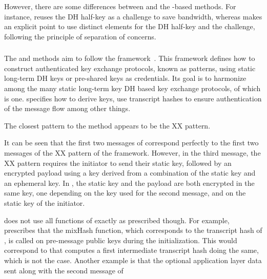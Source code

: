 %
%
However, there are some differences between \mOptls{} and the \mStat{}-based methods. For instance, \mEdhoc{} reuses the DH half-key as a challenge to save bandwidth, whereas \mOptls{} makes an explicit
point to use distinct elements for the DH half-key and the
challenge, following the principle of separation of concerns.
%

\spacehack
\subsubsection{\mNoise{}}
The \mStatStat{} and \mPskPsk{} methods aim to follow the \mNoise{}
framework~\cite{perrin2016noise}.
%
This framework defines how to construct authenticated key exchange protocols,
known as patterns, using static long-term DH keys or pre-shared
keys as credentials.
%
Its goal is to harmonize among the many static long-term key DH 
based key exchange protocols, of which \mOptls{} is one.
%
\mNoise{} specifies how to derive keys, use transcript hashes to ensure
authentication of the message flow among other things.
%

The closest \mNoise{} pattern to the \mStatStat{} method appears to be the
XX pattern.
%

{\color{blue}
It can be seen that the first two messages of \mStatStat{}
correspond perfectly to the first two messages of the XX pattern of
the \mNoise{} framework.
%
However, in the third message, the XX pattern requires
the initiator to send their static key, followed by an encrypted payload using a
key derived from a combination of the static key and an ephemeral key.
%
In \mEdhoc{}, the static key and the payload are both encrypted in the same key, one depending on the key used for the second message, and on the static key of the initiator.
}

\mEdhoc{} does not use all functions of \mNoise{} exactly as prescribed though.
%
For example, \mNoise{} prescribes that the mixHash function, which corresponds
to the transcript hash of \mEdhoc{}, is called on pre-message public keys
during the initialization.
%
This would correspond to that \mEdhoc{} computes a first intermediate transcript
hash doing the same, which is not the case.
%
Another example is that the optional application layer data sent along with
the second message of \mNoise{}

